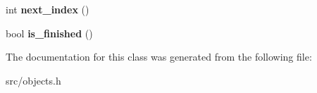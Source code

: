 \begin{DoxyCompactItemize}
\item 
\hypertarget{classv8_1_1internal_1_1_constant_pool_array_1_1_b_a_s_e___e_m_b_e_d_d_e_d_ac9256a6cd51d3249d112d54f383c9428}{}int {\bfseries next\+\_\+index} ()\label{classv8_1_1internal_1_1_constant_pool_array_1_1_b_a_s_e___e_m_b_e_d_d_e_d_ac9256a6cd51d3249d112d54f383c9428}

\item 
\hypertarget{classv8_1_1internal_1_1_constant_pool_array_1_1_b_a_s_e___e_m_b_e_d_d_e_d_a7944336a3bef39c6cbf288e91e711d02}{}bool {\bfseries is\+\_\+finished} ()\label{classv8_1_1internal_1_1_constant_pool_array_1_1_b_a_s_e___e_m_b_e_d_d_e_d_a7944336a3bef39c6cbf288e91e711d02}

\end{DoxyCompactItemize}


The documentation for this class was generated from the following file\+:\begin{DoxyCompactItemize}
\item 
src/objects.\+h\end{DoxyCompactItemize}
